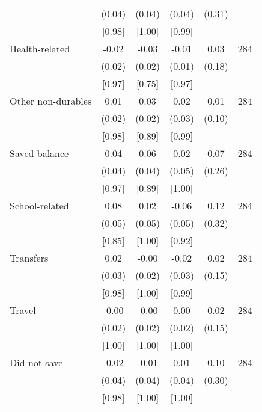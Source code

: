 \begin{table}[ht]
{\begin{threeparttable}
\begin{tabular}{l*{5}{c}}
          &   (0.04)&   (0.04)&   (0.04)&   (0.31)&         \\
          &   [0.98]&   [1.00]&   [0.99]&         &         \\
Health-related&    -0.02&-0.03\sym{*}&    -0.01&     0.03&      284\\
          &   (0.02)&   (0.02)&   (0.01)&   (0.18)&         \\
          &   [0.97]&   [0.75]&   [0.97]&         &         \\
Other non-durables&     0.01&     0.03&     0.02&     0.01&      284\\
          &   (0.02)&   (0.02)&   (0.03)&   (0.10)&         \\
          &   [0.98]&   [0.89]&   [0.99]&         &         \\
Saved balance&     0.04&     0.06&     0.02&     0.07&      284\\
          &   (0.04)&   (0.04)&   (0.05)&   (0.26)&         \\
          &   [0.97]&   [0.89]&   [1.00]&         &         \\
School-related&     0.08&     0.02&    -0.06&     0.12&      284\\
          &   (0.05)&   (0.05)&   (0.05)&   (0.32)&         \\
          &   [0.85]&   [1.00]&   [0.92]&         &         \\
Transfers &     0.02&    -0.00&    -0.02&     0.02&      284\\
          &   (0.03)&   (0.02)&   (0.03)&   (0.15)&         \\
          &   [0.98]&   [1.00]&   [0.99]&         &         \\
Travel    &    -0.00&    -0.00&     0.00&     0.02&      284\\
          &   (0.02)&   (0.02)&   (0.02)&   (0.15)&         \\
          &   [1.00]&   [1.00]&   [1.00]&         &         \\
Did not save&    -0.02&    -0.01&     0.01&     0.10&      284\\
          &   (0.04)&   (0.04)&   (0.04)&   (0.30)&         \\
          &   [0.98]&   [1.00]&   [1.00]&         &         \\
\bottomrule \end{tabular} \begin{tablenotes}[flushleft] \footnotesize \item  \end{tablenotes} \end{threeparttable} } \end{table}
